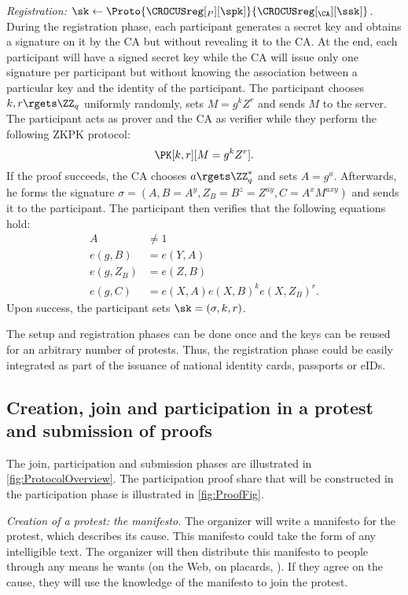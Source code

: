 \emph{Registration: \(\sk\gets 
    \Proto{\CROCUSreg[_P][\spk]}{\CROCUSreg[_{\CA}][\ssk]}\).}
During the registration phase, each participant generates a secret key and 
obtains a signature on it by the \ac{CA} but without revealing it to the 
\ac{CA}.
At the end, each participant will have a signed secret key while the \ac{CA} 
will issue only one signature per participant but without knowing the 
association between a particular key and the identity of the participant.
The participant chooses \(k, r\rgets \ZZ_q\) uniformly randomly, sets \(M = g^k Z^r\) and sends \(M\) to the server.
The participant acts as prover and the \ac{CA} as verifier while they perform 
the following \ac{ZKPK} protocol:
\[
  \PK[k,r][M = g^k Z^r].
\]
If the proof succeeds, the \ac{CA} chooses \(a\rgets \ZZ_q^*\) and sets \(A = g^a\).
Afterwards, he forms the signature \(\sigma = (A, B = A^y, Z_B = B^z = Z^{ay}, 
  C = A^x M^{axy})\) and sends it to the participant.
The participant then verifies that the following equations hold:
\begin{align*}
  A &\neq 1 \\
  e(g, B) &= e(Y, A) \\
  e(g, Z_B) &= e(Z, B) \\
  e(g, C) &= e(X, A) e(X, B)^k e(X, Z_B)^r.
\end{align*}
Upon success, the participant sets \(\sk = (\sigma, k, r)\).

The setup and registration phases can be done once and the keys can be reused 
for an arbitrary number of protests.
Thus, the registration phase could be easily integrated as part of the issuance 
of national identity cards, passports or \acp{eID}.

\subsection{Creation, join and participation in a protest and submission of proofs}%
\label{ProtocolDuring}

The join, participation and submission phases are illustrated in \cref{fig:ProtocolOverview}.
The participation proof share that will be constructed in the participation phase is illustrated in \cref{fig:ProofFig}.

\emph{Creation of a protest: the manifesto.}
The organizer will write a manifesto for the protest, which describes its cause.
This manifesto could take the form of any intelligible text.
The organizer will then distribute this manifesto to people through any means he wants (\eg on the Web, on placards, \etc).
If they agree on the cause, they will use the knowledge of the manifesto to join the protest.


